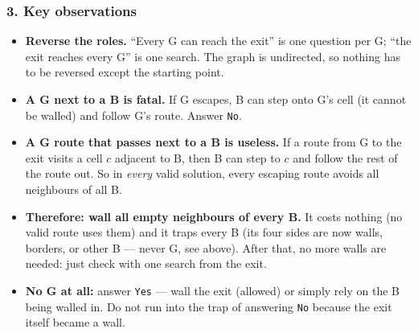 \begin{diagrambox}
\end{diagrambox}

\subsubsection*{3. Key observations}

\begin{itemize}[leftmargin=*]
    \item \textbf{Reverse the roles.} ``Every G can reach the exit'' is one question per G; ``the exit reaches every G'' is one search. The graph is undirected, so nothing has to be reversed except the starting point.
    \item \textbf{A G next to a B is fatal.} If G escapes, B can step onto G's cell (it cannot be walled) and follow G's route. Answer \texttt{No}.
    \item \textbf{A G route that passes next to a B is useless.} If a route from G to the exit visits a cell $c$ adjacent to B, then B can step to $c$ and follow the rest of the route out. So in \emph{every} valid solution, every escaping route avoids all neighbours of all B.
    \item \textbf{Therefore: wall all empty neighbours of every B.} It costs nothing (no valid route uses them) and it traps every B (its four sides are now walls, borders, or other B --- never G, see above). After that, no more walls are needed: just check with one search from the exit.
    \item \textbf{No G at all:} answer \texttt{Yes} --- wall the exit (allowed) or simply rely on the B being walled in. Do not run into the trap of answering \texttt{No} because the exit itself became a wall.
\end{itemize}

